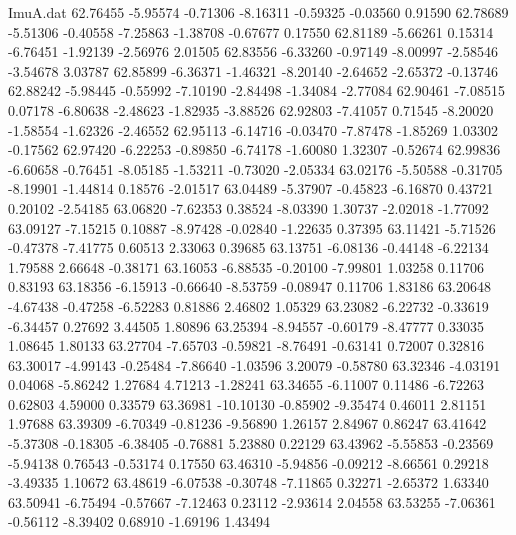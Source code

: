 \begin{filecontents}{ImuA.dat}
  62.76455   -5.95574   -0.71306   -8.16311   -0.59325   -0.03560    0.91590
  62.78689   -5.51306   -0.40558   -7.25863   -1.38708   -0.67677    0.17550
  62.81189   -5.66261    0.15314   -6.76451   -1.92139   -2.56976    2.01505
  62.83556   -6.33260   -0.97149   -8.00997   -2.58546   -3.54678    3.03787
  62.85899   -6.36371   -1.46321   -8.20140   -2.64652   -2.65372   -0.13746
  62.88242   -5.98445   -0.55992   -7.10190   -2.84498   -1.34084   -2.77084
  62.90461   -7.08515    0.07178   -6.80638   -2.48623   -1.82935   -3.88526
  62.92803   -7.41057    0.71545   -8.20020   -1.58554   -1.62326   -2.46552
  62.95113   -6.14716   -0.03470   -7.87478   -1.85269    1.03302   -0.17562
  62.97420   -6.22253   -0.89850   -6.74178   -1.60080    1.32307   -0.52674
  62.99836   -6.60658   -0.76451   -8.05185   -1.53211   -0.73020   -2.05334
  63.02176   -5.50588   -0.31705   -8.19901   -1.44814    0.18576   -2.01517
  63.04489   -5.37907   -0.45823   -6.16870    0.43721    0.20102   -2.54185
  63.06820   -7.62353    0.38524   -8.03390    1.30737   -2.02018   -1.77092
  63.09127   -7.15215    0.10887   -8.97428   -0.02840   -1.22635    0.37395
  63.11421   -5.71526   -0.47378   -7.41775    0.60513    2.33063    0.39685
  63.13751   -6.08136   -0.44148   -6.22134    1.79588    2.66648   -0.38171
  63.16053   -6.88535   -0.20100   -7.99801    1.03258    0.11706    0.83193
  63.18356   -6.15913   -0.66640   -8.53759   -0.08947    0.11706    1.83186
  63.20648   -4.67438   -0.47258   -6.52283    0.81886    2.46802    1.05329
  63.23082   -6.22732   -0.33619   -6.34457    0.27692    3.44505    1.80896
  63.25394   -8.94557   -0.60179   -8.47777    0.33035    1.08645    1.80133
  63.27704   -7.65703   -0.59821   -8.76491   -0.63141    0.72007    0.32816
  63.30017   -4.99143   -0.25484   -7.86640   -1.03596    3.20079   -0.58780
  63.32346   -4.03191    0.04068   -5.86242    1.27684    4.71213   -1.28241
  63.34655   -6.11007    0.11486   -6.72263    0.62803    4.59000    0.33579
  63.36981  -10.10130   -0.85902   -9.35474    0.46011    2.81151    1.97688
  63.39309   -6.70349   -0.81236   -9.56890    1.26157    2.84967    0.86247
  63.41642   -5.37308   -0.18305   -6.38405   -0.76881    5.23880    0.22129
  63.43962   -5.55853   -0.23569   -5.94138    0.76543   -0.53174    0.17550
  63.46310   -5.94856   -0.09212   -8.66561    0.29218   -3.49335    1.10672
  63.48619   -6.07538   -0.30748   -7.11865    0.32271   -2.65372    1.63340
  63.50941   -6.75494   -0.57667   -7.12463    0.23112   -2.93614    2.04558
  63.53255   -7.06361   -0.56112   -8.39402    0.68910   -1.69196    1.43494

\end{filecontents}
